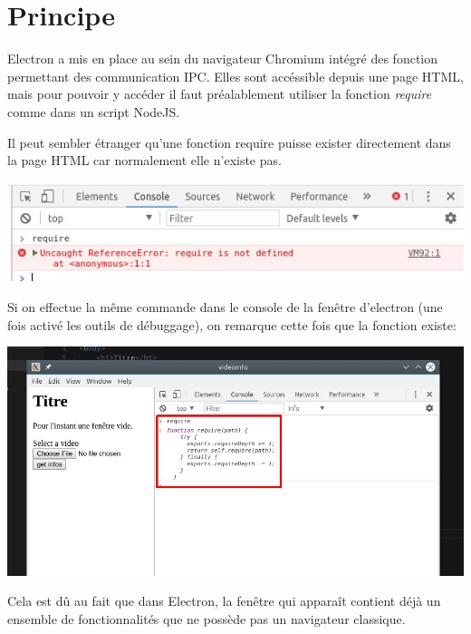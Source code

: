 \documentclass[12pt,oneside]{scrbook}
\begin{document}
\section{Principe}
Electron a mis en place au sein du navigateur Chromium intégré des fonction permettant des communication IPC. Elles sont accéssible depuis une page HTML, mais pour pouvoir y accéder il faut préalablement utiliser la fonction \textit{require} comme dans un script NodeJS.

Il peut sembler étranger qu'une fonction require puisse exister directement dans la page HTML car normalement elle n'existe pas.

\begin{center}
\includegraphics[width=\textwidth]{./img/chrome_require_fail.jpg}
\label{fig1}
\end{center}

Si on effectue la même commande dans le console de la fenêtre d'electron (une fois activé les outils de débuggage), on remarque cette fois que la fonction existe:

\begin{center}
\includegraphics[width=\textwidth]{./img/chrome_require_ok.jpg}
\label{fig1}
\end{center}

Cela est dû au fait que dans Electron, la fenêtre qui apparaît contient déjà un ensemble de fonctionnalités que ne possède pas un navigateur classique.
\end{document}
